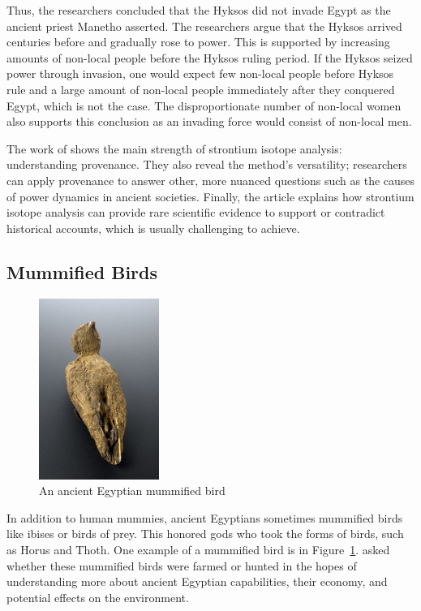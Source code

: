 \documentclass[a4paper, 12pt]{article}
\begin{document}
Thus, the researchers concluded that the Hyksos did not invade Egypt
as the ancient priest Manetho asserted. The researchers argue that the Hyksos
arrived centuries before and gradually rose to power. This is supported
by increasing amounts of non-local people before the Hyksos ruling
period. If the Hyksos seized power through invasion, one would expect few non-local
people before Hyksos rule and a large amount of non-local people immediately after they conquered Egypt, which
is not the case. The disproportionate number of non-local women also supports this conclusion
as an invading force would consist of non-local men.

The work of \cite{stantis2020} shows the main strength of strontium isotope analysis:
understanding provenance. They also reveal the method's versatility; researchers can
apply provenance to answer other, more nuanced questions such as the causes of
power dynamics in ancient societies. Finally, the article explains how strontium isotope
analysis can provide rare scientific evidence to support or contradict
historical accounts, which is usually challenging to achieve.


\subsection{Mummified Birds}
\begin{figure}[htbp]
    \centering
    \includegraphics[width=0.35\textwidth]{mummy_bird.jpg}
    \caption{An ancient Egyptian mummified bird \citep{wikipediaBird}}
    \label{fig:mummy_bird}
\end{figure}
In addition to human mummies, ancient Egyptians sometimes mummified birds
like ibises or birds of prey. This honored gods who took
the forms of birds, such as Horus and Thoth. One example of a mummified bird is in Figure~\ref{fig:mummy_bird}.
\cite{linglin2020} asked whether these mummified birds were farmed or hunted in the hopes of understanding
more about ancient Egyptian capabilities, their economy, and potential effects on
the environment.
\end{document}
